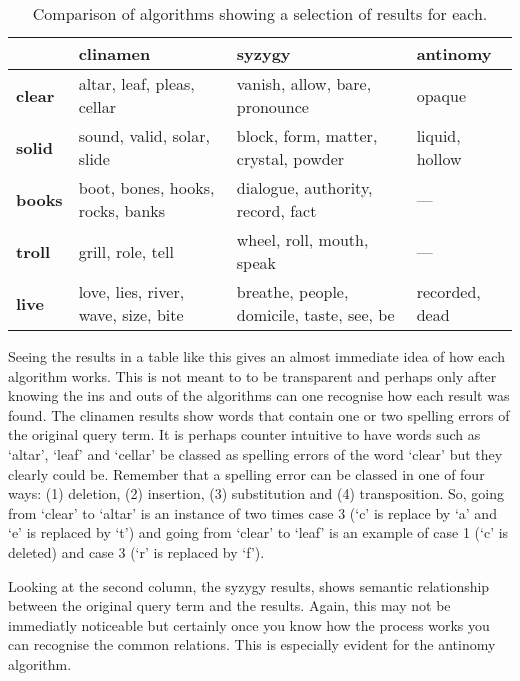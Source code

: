 \begin{table}[htb]
  \begin{tabu}{X[1,L]|X[3,L]X[3,L]X[2,L]}
  \toprule
  &
  \textbf{clinamen}
  &
  \textbf{syzygy}
  &
  \textbf{antinomy}
  \\ \midrule
  \textbf{clear}
  &
  altar, leaf, pleas, cellar
  &
  vanish, allow, bare, pronounce
  &
  opaque
  \\ \midrule
  \textbf{solid}
  &
  sound, valid, solar, slide
  &
  block, form, matter, crystal, powder
  &
  liquid, hollow
  \\ \midrule
  \textbf{books}
  &
  boot, bones, hooks, rocks, banks
  &
  dialogue, authority, record, fact
  &
  ---
  \\ \midrule
  \textbf{troll}
  &
  grill, role, tell
  &
  wheel, roll, mouth, speak
  &
  ---
  \\ \midrule
  \textbf{live}
  &
  love, lies, river, wave, size, bite
  &
  breathe, people, domicile, taste, see, be
  &
  recorded, dead
  \\ \bottomrule
  \end{tabu}
\caption[Comparison of algorithms]{Comparison of algorithms showing a selection of results for each.}
\label{algorithmscomp}
\end{table}

Seeing the results in a table like this gives an almost immediate idea of how each algorithm works. This is not meant to to be transparent and perhaps only after knowing the ins and outs of the algorithms can one recognise how each result was found. The clinamen results show words that contain one or two spelling errors of the original query term. It is perhaps counter intuitive to have words such as `altar', `leaf' and `cellar' be classed as spelling errors of the word `clear' but they clearly could be. Remember that a spelling error can be classed in one of four ways: (1) deletion, (2) insertion, (3) substitution and (4) transposition. So, going from `clear' to `altar' is an instance of two times case 3 (`c' is replace by `a' and `e' is replaced by `t') and going from  `clear' to `leaf' is an example of case 1 (`c' is deleted) and case 3 (`r' is replaced by `f').

Looking at the second column, the syzygy results, shows semantic relationship between the original query term and the results. Again, this may not be immediatly noticeable but certainly once you know how the process works you can recognise the common relations. This is especially evident for the antinomy algorithm.

